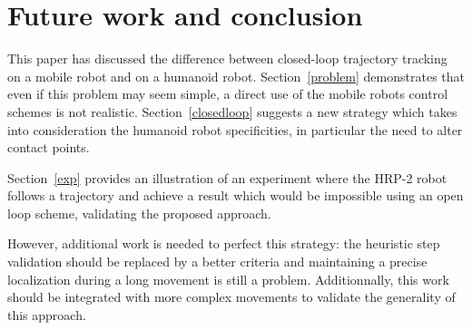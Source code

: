 \section{Future work and conclusion}


This paper has discussed the difference between closed-loop trajectory
tracking on a mobile robot and on a humanoid
robot. Section~\ref{problem} demonstrates that even if this problem
may seem simple, a direct use of the mobile robots control schemes is
not realistic.  Section~\ref{closedloop} suggests a new strategy which
takes into consideration the humanoid robot specificities, in
particular the need to alter contact points.


Section~\ref{exp} provides an illustration of an experiment where the
HRP-2 robot follows a trajectory and achieve a result which would be
impossible using an open loop scheme, validating the proposed
approach.


However, additional work is needed to perfect this strategy: the
heuristic step validation should be replaced by a better criteria and
maintaining a precise localization during a long movement is still a
problem. Additionnally, this work should be integrated with more
complex movements to validate the generality of this approach.

